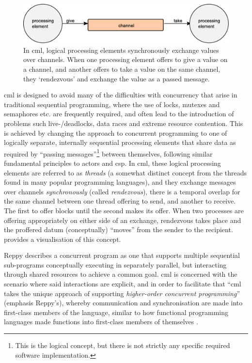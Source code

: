 \begin{figure}
    \centering
    \includegraphics[width=\textwidth]{chapters/background/images/cml_exchange.eps}
    \caption[Diagram of the message-passing primitive in ]{In \gls{cml}, logical processing elements synchronously exchange values over channels.  When one processing element offers to give a value on a channel, and another offers to take a value on the same channel, they ‘rendezvous’ and exchange the value as a passed message.}
    \label{fig:back:cml_exchange}
\end{figure}

\Gls{cml} is designed to avoid many of the difficulties with concurrency that arise in traditional sequential programming, where the use of locks, mutexes and semaphores etc. are frequently required, and often lead to the introduction of problems such live-/deadlocks, data races and extreme resource contention.  This is achieved by changing the approach to concurrent programming to one of logically separate, internally sequential processing elements that share data as required by ``passing messages''\footnote{This is the logical concept, but there is not strictly any specific required software implementation.} between themselves, following similar fundamental principles to \glspl{actor} and \gls{csp}.  In \gls{cml}, these logical processing elements are referred to as \emph{threads} (a somewhat distinct concept from the threads found in many popular programming languages), and they exchange messages over channels \emph{synchronously} (called \emph{rendezvous}), \ie{} there is a temporal overlap for the same channel between one thread offering to send, and another to receive.  The first to offer blocks until the second makes its offer.  When two processes are offering appropriately on either side of an exchange, rendezvous takes place and the proffered datum (conceptually) ``moves'' from the sender to the recipient.   provides a visualisation of this concept.

Reppy describes a concurrent program as one that supports multiple sequential sub-programs conceptually executing in separately parallel, but interacting through shared resources to achieve a common goal.  \Gls{cml} is concerned with the scenario where said interactions are explicit, and in order to facilitate that \enquote{\gls{cml} takes the unique approach of supporting \emph{higher-order concurrent programming}} (emphasis Reppy's), whereby communication and synchronisation are made into first-class members of the language, similar to how functional programming languages made functions into first-class members of themselves \cite[Preface]{Reppy2007}.